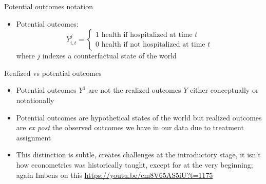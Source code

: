 \documentclass{beamer}
\begin{document}
\begin{frame}{Potential outcomes notation}

  \begin{itemize}
    \item Potential outcomes: $$Y_{i,t}^j =\begin{cases} 1 \text{ health if hospitalized at time $t$} \\ 0 \text{ health if not hospitalized at time $t$} \end{cases}$$where $j$ indexes a counterfactual state of the world
  \end{itemize}
\end{frame}


\begin{frame}{Realized vs potential outcomes}

  \begin{itemize}
    \item Potential outcomes $Y^1$ are not the realized outcomes $Y$ either conceptually or notationally
    \item Potential outcomes are hypothetical states of the world but realized outcomes are \emph{ex post} the observed outcomes we have in our data due to treatment assignment
    \item This distinction is subtle, creates challenges at the introductory stage, it isn't how econometrics was historically taught, except for at the very beginning; again Imbens on this \url{https://youtu.be/cm8V65AS5iU?t=1175}
  \end{itemize}
\end{frame}
\end{document}
